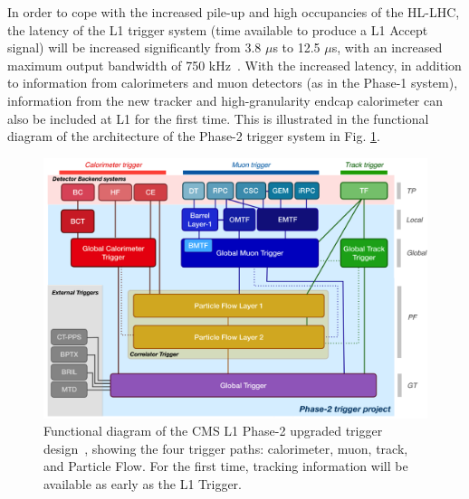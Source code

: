 In order to cope with the increased pile-up and high occupancies of the HL-LHC, the latency of the L1 trigger system (time available to produce a L1 Accept signal) will be increased significantly from 3.8 $\mu$s to 12.5 $\mu$s, with an increased maximum output bandwidth of 750 kHz~\cite{CMS-TDR-021}. With the increased latency, in addition to information from calorimeters and muon detectors (as in the Phase-1 system), information from the new tracker and high-granularity endcap calorimeter can also be included at L1 for the first time. This is illustrated in the functional diagram of the architecture of the Phase-2 trigger system in Fig. \ref{fig:phase-2-l1-architecture}. 

\begin{figure}[ht]
    \centering
    \includegraphics[width=15cm]{figures/ch-3-phase2/phase-2-l1-architecture.png}
    \caption[Functional diagram of the CMS L1 Phase-2 upgraded trigger design.]{Functional diagram of the CMS L1 Phase-2 upgraded trigger design~\cite{CMS-TDR-021}, showing the four trigger paths: calorimeter, muon, track, and Particle Flow. For the first time, tracking information will be available as early as the L1 Trigger.}
    \label{fig:phase-2-l1-architecture}
\end{figure}

